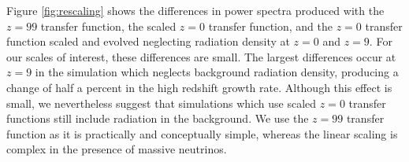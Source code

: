 \documentclass[useAMS, usenatbib]{mnras}
\begin{document}
Figure \ref{fig:rescaling} shows the differences in power spectra 
produced with the $z=99$ transfer function, the
scaled $z=0$ transfer function, and the $z=0$ transfer function
scaled and evolved neglecting radiation density at $z=0$ and $z=9$.
For our scales of interest, these differences are small.
The largest differences occur at $z=9$ in the simulation which neglects 
background radiation density, producing a change of half a percent in 
the high redshift growth rate. Although this effect is small, we nevertheless suggest that simulations
which use scaled $z=0$ transfer functions still include radiation in the background.
We use the $z=99$ transfer function as it is practically and conceptually simple,
whereas the linear scaling is complex in the presence of massive neutrinos.

\label{lastpage}


\end{document}
